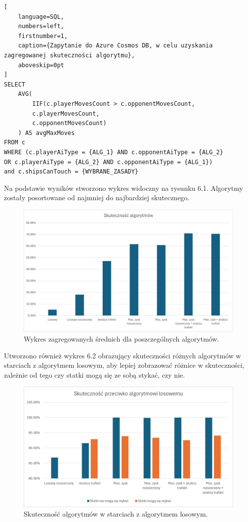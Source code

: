 \begin{addmargin}[10mm]{0mm}
\begin{lstlisting}[
    language=SQL,
    numbers=left,
    firstnumber=1,
    caption={Zapytanie do Azure Cosmos DB, w celu uzyskania zagregowanej skuteczności algorytmu},
    aboveskip=0pt
]
SELECT 
    AVG(
        IIF(c.playerMovesCount > c.opponentMovesCount,
        c.playerMovesCount,
        c.opponentMovesCount)
    ) AS avgMaxMoves
FROM c
WHERE (c.playerAiType = {ALG_1} AND c.opponentAiType = {ALG_2}
OR c.playerAiType = {ALG_2} AND c.opponentAiType = {ALG_1})
and c.shipsCanTouch = {WYBRANE_ZASADY}
\end{lstlisting}
\end{addmargin}

Na podstawie wyników stworzono wykres widoczny na rysunku 6.1. Algorytmy zostały posortowane od najmniej do najbardziej skutecznego.

\begin{figure}[!h]
    \label{fig:aggregate-chart}
    \centering \includegraphics[width=0.9\linewidth]{img/aggregate-chart.png}
    \caption{Wykres zagregowanych średnich dla poszczególnych algorytmów.}
\end{figure}

Utworzono również wykres 6.2 obrazujący skuteczności różnych algorytmów w starciach z algorytmem losowym, aby lepiej zobrazować różnice w skuteczności, zależnie od tego czy statki mogą się ze sobą stykać, czy nie.

\begin{figure}[!h]
    \label{fig:round-avg}
    \centering \includegraphics[width=0.9\linewidth]{img/chart-random-scores.png}
    \caption{Skuteczność algorytmów w starciach z algorytmem losowym.}
\end{figure}

